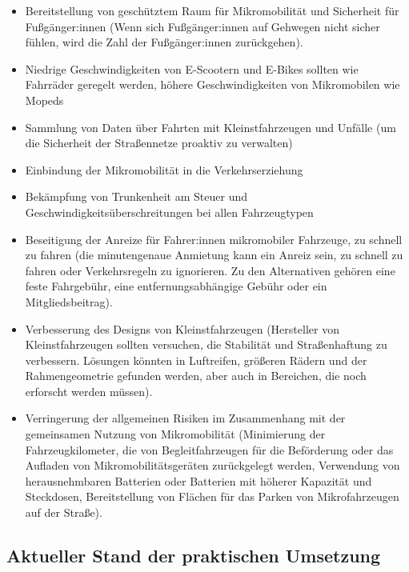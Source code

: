 \documentclass[
]{book}
\providecommand{\tightlist}{%
  \setlength{\itemsep}{0pt}\setlength{\parskip}{0pt}}
\begin{document}
\begin{itemize}
\tightlist
\item
  Bereitstellung von geschütztem Raum für Mikromobilität und Sicherheit für Fußgänger:innen (Wenn sich Fußgänger:innen auf Gehwegen nicht sicher fühlen, wird die Zahl der Fußgänger:innen zurückgehen).
\item
  Niedrige Geschwindigkeiten von E-Scootern und E-Bikes sollten wie Fahrräder geregelt werden, höhere Geschwindigkeiten von Mikromobilen wie Mopeds
\item
  Sammlung von Daten über Fahrten mit Kleinstfahrzeugen und Unfälle (um die Sicherheit der Straßennetze proaktiv zu verwalten)
\item
  Einbindung der Mikromobilität in die Verkehrserziehung
\item
  Bekämpfung von Trunkenheit am Steuer und Geschwindigkeitsüberschreitungen bei allen Fahrzeugtypen
\item
  Beseitigung der Anreize für Fahrer:innen mikromobiler Fahrzeuge, zu schnell zu fahren (die minutengenaue Anmietung kann ein Anreiz sein, zu schnell zu fahren oder Verkehrsregeln zu ignorieren. Zu den Alternativen gehören eine feste Fahrgebühr, eine entfernungsabhängige Gebühr oder ein Mitgliedsbeitrag).
\item
  Verbesserung des Designs von Kleinstfahrzeugen (Hersteller von Kleinstfahrzeugen sollten versuchen, die Stabilität und Straßenhaftung zu verbessern. Lösungen könnten in Luftreifen, größeren Rädern und der Rahmengeometrie gefunden werden, aber auch in Bereichen, die noch erforscht werden müssen).
\item
  Verringerung der allgemeinen Risiken im Zusammenhang mit der gemeinsamen Nutzung von Mikromobilität (Minimierung der Fahrzeugkilometer, die von Begleitfahrzeugen für die Beförderung oder das Aufladen von Mikromobilitätsgeräten zurückgelegt werden, Verwendung von herausnehmbaren Batterien oder Batterien mit höherer Kapazität und Steckdosen, Bereitstellung von Flächen für das Parken von Mikrofahrzeugen auf der Straße).
\end{itemize}

\hypertarget{aktueller-stand-der-praktischen-umsetzung-22}{%
\subsection*{Aktueller Stand der praktischen Umsetzung}\label{aktueller-stand-der-praktischen-umsetzung-22}}
\end{document}
